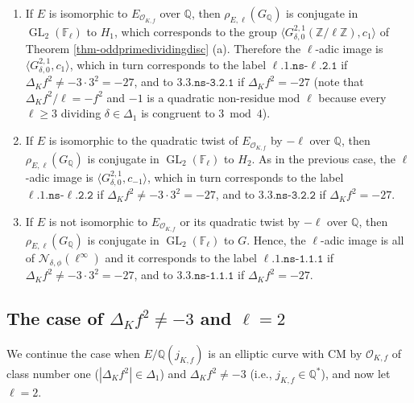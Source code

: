 \documentclass[11pt]{amsart}
\theoremstyle{definition}
\newcommand{\Q}{\mathbb Q}
\newcommand{\Z}{\mathbb Z}
\newcommand{\FF}{\mathbb F}
\newcommand{\Of}{\mathcal{O}_{K,f}}
\newcommand{\GL}{\operatorname{GL}}
\begin{document}
\begin{enumerate}
\item If $E$ is isomorphic to $E_{\Of}$ over $\Q$, then $\rho_{E,\ell}(G_\Q)$ is conjugate in $\GL_2(\FF_\ell)$ to $H_1$, which corresponds to the group $\langle G^{2,1}_{\delta,0}(\Z/\ell\Z), c_1\rangle$ of Theorem \ref{thm-oddprimedividingdisc} (a). Therefore the $\ell$-adic image is $\langle G^{2,1}_{\delta,0}, c_1\rangle$, which in turn corresponds to the label $\ell\texttt{.}1\texttt{.ns-}\ell\texttt{.2.1}$ if $\Delta_K f^2\neq -3\cdot 3^2=-27$, and to $3\texttt{.}3\texttt{.ns-}\texttt{3.2.1}$ if $\Delta_K f^2 = -27$ (note that $\Delta_K f^2/\ell = -f^2$ and $-1$ is a quadratic non-residue mod $\ell$ because every $\ell\geq 3$ dividing $\delta\in \Delta_1$ is congruent to $3 \bmod 4$).

\item If $E$ is isomorphic to the quadratic twist of $E_{\Of}$ by $-\ell$ over $\Q$, then $\rho_{E,\ell}(G_\Q)$ is conjugate in $\GL_2(\FF_\ell)$ to $H_2$. As in the previous case, the $\ell$-adic image is $\langle G^{2,1}_{\delta,0}, c_{-1}\rangle$, which in turn corresponds to the label $\ell\texttt{.}1\texttt{.ns-}\ell\texttt{.2.2}$ if $\Delta_K f^2\neq -3\cdot 3^2=-27$, and to $3\texttt{.}3\texttt{.ns-}\texttt{3.2.2}$ if $\Delta_K f^2 = -27.$

\item If $E$ is not isomorphic to $E_{\Of}$ or its quadratic twist by $-\ell$ over $\Q$, then $\rho_{E,\ell}(G_\Q)$ is conjugate in $\GL_2(\FF_\ell)$ to $G$. Hence, the $\ell$-adic image is all of $\mathcal{N}_{\delta,\phi}(\ell^\infty)$ and it corresponds to the label $\ell\texttt{.}1\texttt{.ns-1.1.1}$ if $\Delta_K f^2\neq -3\cdot 3^2=-27$, and to $3\texttt{.}3\texttt{.ns-1.1.1}$ if $\Delta_K f^2 = -27.$

\end{enumerate}

\subsection{The case of $\Delta_K f^2\neq -3$ and $\ell=2$}\label{sec-notminus3ellequals2} We continue the case when $E/\Q(j_{K,f})$ is an elliptic curve with CM by $\Of$ of class number one ($|\Delta_K f^2|\in \Delta_1$) and $\Delta_K f^2\neq -3$ (i.e., $j_{K,f}\in \Q^\ast$), and now let $\ell=2$. 
\end{document}
